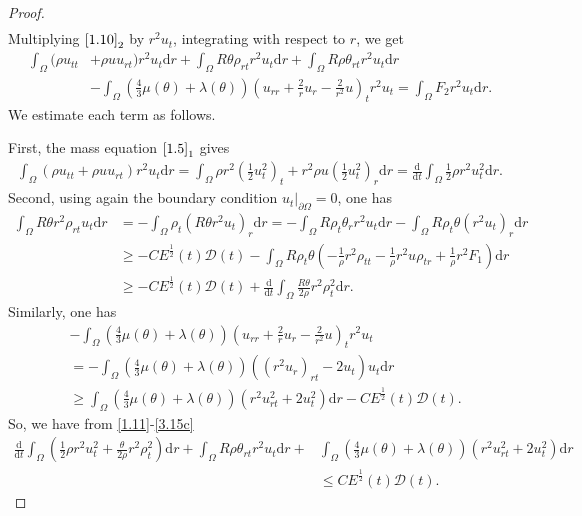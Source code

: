 \documentclass[11pt,reqno]{amsart}
\numberwithin{equation}{section}
\newcommand{\dif}{\mathrm{d}}
\begin{document}
\begin{proof}
\begin{align*}
 \end{align*}
 Multiplying $\eqref{1.10}_2$ by $r^2u_t$, integrating with respect to $r$, we get
 \begin{align} \label{1.11}
 \int_{\Omega}  (\rho u_{tt}&+\rho u u_{rt}) r^2 u_t \dif r+ \int_{\Omega} R \theta \rho_{rt} r^2 u_t  \dif r +\int_{\Omega} R \rho \theta_{rt} r^2 u_t \dif r\nonumber\\
&-\int_{\Omega} (\frac{4}{3} \mu(\theta)+\lambda(\theta))\left(u_{rr}+\frac{2}{r} u_r-\frac{2}{r^2} u\right)_t r^2 u_t=\int_{\Omega} F_2 r^2 u_t \dif r.
 \end{align}
 We estimate each term as follows.

 First, the mass equation $\eqref{1.5}_1$ gives
 \begin{align} \label{3.15a}
 \int_{\Omega}  (\rho u_{tt}+\rho u u_{rt}) r^2 u_t \dif r=\int_{\Omega} \rho r^2 \left(\frac{1}{2} u_t^2 \right)_t +r^2 \rho u \left(\frac{1}{2} u_t^2\right)_r \dif r
 =\frac{\dif}{\dif t} \int_{\Omega} \frac{1}{2} \rho r^2 u_t^2 \dif r.
 \end{align}
Second, using again the boundary condition $u_t|_{\partial \Omega}=0$, one has
\begin{align}
\int_{\Omega} R \theta r^2 \rho_{rt} u_t \dif r&= -\int_{\Omega} \rho_t (R \theta r^2 u_t)_r \dif r
=-\int_{\Omega} R\rho_t \theta_r r^2 u_t \dif r -\int_{\Omega} R \rho_t \theta (r^2 u_t)_r \dif r \nonumber\\
& \ge  -CE^\frac{1}{2}(t) \mathcal D(t)-\int_{\Omega} R\rho_t \theta \left( -\frac{1}{\rho} r^2 \rho_{tt}-\frac{1}{\rho} r^2 u \rho_{tr}+\frac{1}{\rho} r^2 F_1\right)\dif r \nonumber\\
&\ge -CE^\frac{1}{2}(t) \mathcal D(t)+\frac{\dif}{\dif t} \int_{\Omega} \frac{R\theta}{2\rho} r^2 \rho_t^2 \dif r.
\label{3.15b}
\end{align}
Similarly, one has
\begin{align}
&-\int_{\Omega} (\frac{4}{3} \mu(\theta)+\lambda(\theta))\left(u_{rr}+\frac{2}{r} u_r-\frac{2}{r^2} u\right)_t r^2 u_t \nonumber\\&
=-\int_{\Omega} (\frac{4}{3} \mu(\theta)+\lambda(\theta))\left( (r^2 u_r)_{rt}-2 u_t\right) u_t \dif r \nonumber \\
&\ge \int_{\Omega}  (\frac{4}{3} \mu(\theta)+\lambda(\theta))(r^2 u_{rt}^2+2u_t^2)\dif r
  -CE^\frac{1}{2}(t) \mathcal D(t).
\label{3.15c}
\end{align}
So, we have from \eqref{1.11}-\eqref{3.15c}
\begin{align}\label{1.12}
\frac{\dif}{\dif t} \int_{\Omega} \left(\frac{1}{2} \rho r^2 u_t^2+\frac{\theta}{2\rho} r^2 \rho_t^2 \right)\dif r + \int_{\Omega}  R \rho \theta_{rt} r^2 u_t \dif r +&\int_{\Omega}  (\frac{4}{3} \mu(\theta)+\lambda(\theta))(r^2 u_{rt}^2+2u_t^2)\dif r
\nonumber\\
&\le CE^\frac{1}{2}(t) \mathcal D(t).
 \end{align}


\end{proof}
\end{document}
